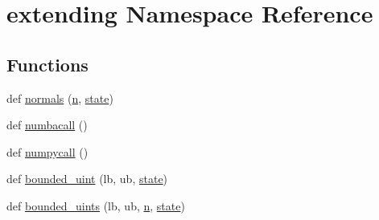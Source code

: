 \hypertarget{namespaceextending}{}\section{extending Namespace Reference}
\label{namespaceextending}
\subsection*{Functions}
\begin{DoxyCompactItemize}
\item 
def \hyperlink{namespaceextending_a9428868b82dc14cfc42f679c7cd44bd5}{normals} (\hyperlink{namespaceextending_a21e20aebc37260633c41ed4bacccf880}{n}, \hyperlink{namespaceextending_a6228eb907acb00d4e6178f7b10aa3435}{state})
\item 
def \hyperlink{namespaceextending_a4406ac784cc5c2435dec4e7f1e9a5147}{numbacall} ()
\item 
def \hyperlink{namespaceextending_aeb6f21fd12d96f370964f44537a9f908}{numpycall} ()
\item 
def \hyperlink{namespaceextending_ad8fa47df7e72bc24c54020bb8f8bafee}{bounded\+\_\+uint} (lb, ub, \hyperlink{namespaceextending_a6228eb907acb00d4e6178f7b10aa3435}{state})
\item 
def \hyperlink{namespaceextending_a94f605864f41957f25eaccc9b95a7fb5}{bounded\+\_\+uints} (lb, ub, \hyperlink{namespaceextending_a21e20aebc37260633c41ed4bacccf880}{n}, \hyperlink{namespaceextending_a6228eb907acb00d4e6178f7b10aa3435}{state})
\end{DoxyCompactItemize}
